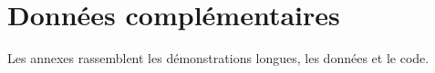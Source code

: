 \chapter{Données complémentaires}
\label{chap:annexe}

Les annexes rassemblent les démonstrations longues, les données et le code.
